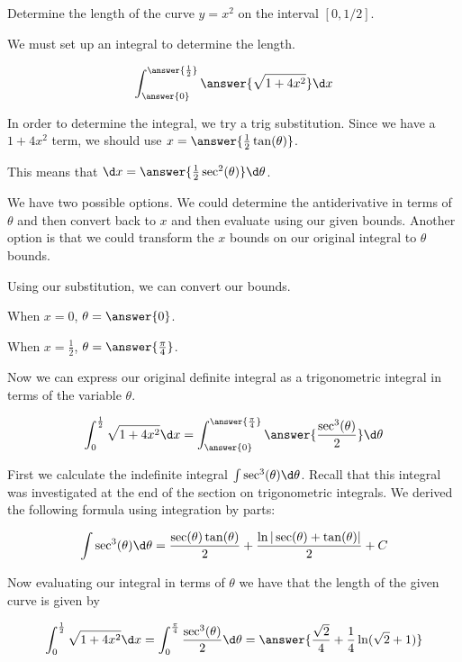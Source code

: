 \documentclass{ximera}
\author{Jason Miller}
\begin{document}
\begin{exercise}
Determine the length of the curve $y=x^{2}$ on the interval $[0,1/2]$. 

We must set up an integral to determine the length. 

\[
\int_{\answer{0}}^{\answer{\frac{1}{2}}} \answer{ \sqrt{1+4x^{2}}} \d x
\]

\begin{exercise}

In order to determine the integral, we try a trig substitution.
Since we have a $1+4x^{2}$ term, we should use $x=\answer{\frac{1}{2}\tan(\theta)}$. 

This means that $\d x= \answer{ \frac{1}{2}\sec^{2}(\theta)} \d \theta$. 

We have two possible options. We could determine the antiderivative in terms of $\theta$ 
and then convert back to $x$ and then evaluate using our given bounds. 
Another option is that we could transform the $x$ bounds on our original integral to $\theta$ bounds. 

Using our substitution, we can convert our bounds.

When $x=0$, $\theta=\answer{0}$. 

When $x=\frac{1}{2}$, $\theta=\answer{\frac{\pi}{4}}$. 



\begin{exercise}


Now we can express our original definite integral as a trigonometric integral in terms of the variable $\theta$. 

\[
\int_{0}^{\frac{1}{2}} \sqrt{1+4x^{2}} \d x= \int_{\answer{0}}^{\answer{\frac{\pi}{4}}}  \answer{\frac{\sec^{3}(\theta)}{2}}   \d \theta
\]


First we calculate the indefinite integral $\int \sec^{3}(\theta) \d \theta$. Recall that this integral was investigated at the end of the section on trigonometric integrals. 
We derived the following formula using integration by parts:

\[
\int \sec^{3}(\theta) \d \theta=\frac{\sec(\theta)\tan(\theta)}{2} + \frac{ \ln| \sec(\theta) + \tan(\theta) | }{2} + C
\]

\begin{exercise}
Now evaluating our integral in terms of $\theta$ we have that the length of the given curve is given by

\[
\int_{0}^{\frac{1}{2}} \sqrt{1+4x^{2}} \d x= \int_{0}^{\frac{\pi}{4}}  \frac{\sec^{3}(\theta)}{2}   \d \theta =\answer{\frac{\sqrt{2}}{4} + \frac{1}{4}\ln(\sqrt{2}+1) }
\]




\end{exercise}
\end{exercise}

\end{exercise}

\end{exercise}
\end{document}
